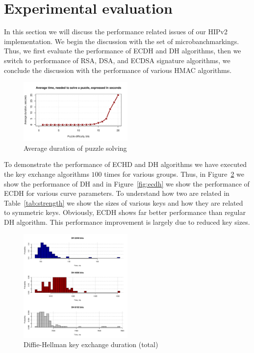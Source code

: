 \section{Experimental evaluation}
\label{section:experiments}

In this section we will discuss the performance related issues of our 
HIPv2 implementation. We begin the discussion with the set of 
microbanchmarkings. Thus, we first evaluate the performance of ECDH and DH
algorithms, then we switch to performance of RSA, DSA, and ECDSA signature
algorithms, we conclude the discussion with the performance of various HMAC 
algorithms.

\begin{figure}
	\includegraphics[width=0.5\textwidth]{graphics/puzzle_solution_perf.pdf}
	\caption{Average duration of puzzle solving}
	\label{fig:puzzle}
\end{figure}

To demonstrate the performance of ECHD and DH algorithms we have 
executed the key exchange algorithms $100$ times for various 
groups. Thus, in Figure~\ref{fig:dh} we show the performance of
DH and in Figure~\ref{fig:ecdh} we show the performance 
of ECDH for various curve parameters. To understand how two
are related in Table~\ref{tab:strength} we show the sizes
of various keys and how they are related to symmetric keys.
Obviously, ECDH shows far better performance than regular
DH algorithm. This performance improvement is largely due
to reduced key sizes.

\begin{figure}
	\includegraphics[width=0.5\textwidth]{graphics/dh_computation_hist.pdf}
	\caption{Diffie-Hellman key exchange duration (total)}
	\label{fig:dh}
\end{figure}

